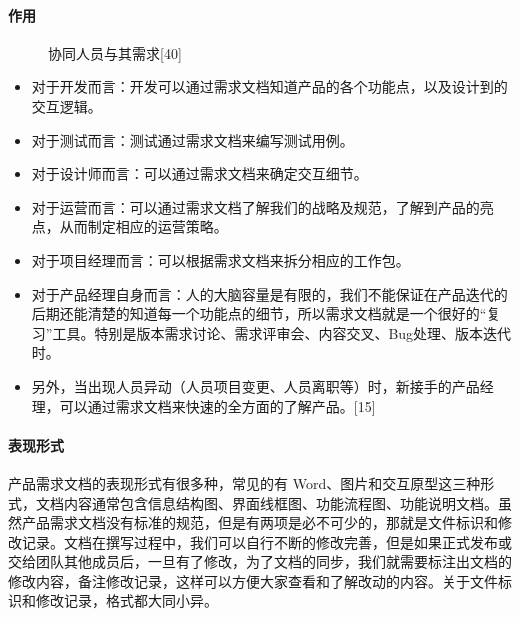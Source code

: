 \documentclass[letterpaper,10pt,english]{sphinxmanual}
\begin{document}
\paragraph{作用}
\label{\detokenize{chapter_knowledge/PRD:id9}}
\begin{figure}[H]
\centering
\capstart

\noindent{}
\caption{协同人员与其需求{[}40{]}}\label{\detokenize{chapter_knowledge/PRD:id32}}\end{figure}
\begin{itemize}
\item {} 
对于开发而言：开发可以通过需求文档知道产品的各个功能点，以及设计到的交互逻辑。

\item {} 
对于测试而言：测试通过需求文档来编写测试用例。

\item {} 
对于设计师而言：可以通过需求文档来确定交互细节。

\item {} 
对于运营而言：可以通过需求文档了解我们的战略及规范，了解到产品的亮点，从而制定相应的运营策略。

\item {} 
对于项目经理而言：可以根据需求文档来拆分相应的工作包。

\item {} 
对于产品经理自身而言：人的大脑容量是有限的，我们不能保证在产品迭代的后期还能清楚的知道每一个功能点的细节，所以需求文档就是一个很好的“复习”工具。特别是版本需求讨论、需求评审会、内容交叉、Bug处理、版本迭代时。

\item {} 
另外，当出现人员异动（人员项目变更、人员离职等）时，新接手的产品经理，可以通过需求文档来快速的全方面的了解产品。{[}15{]}

\end{itemize}


\paragraph{表现形式}
\label{\detokenize{chapter_knowledge/PRD:id10}}
产品需求文档的表现形式有很多种，常见的有
Word、图片和交互原型这三种形式，文档内容通常包含信息结构图、界面线框图、功能流程图、功能说明文档。虽然产品需求文档没有标准的规范，但是有两项是必不可少的，那就是文件标识和修改记录。文档在撰写过程中，我们可以自行不断的修改完善，但是如果正式发布或交给团队其他成员后，一旦有了修改，为了文档的同步，我们就需要标注出文档的修改内容，备注修改记录，这样可以方便大家查看和了解改动的内容。关于文件标识和修改记录，格式都大同小异。
\end{document}
